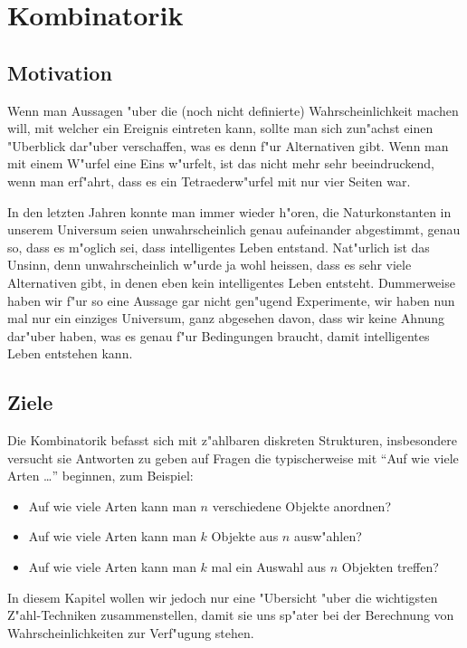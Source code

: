 %
%
%
\chapter{Kombinatorik} \label{chapter-kombinatorik}
\section{Motivation}
Wenn man Aussagen "uber die (noch nicht definierte) Wahrscheinlichkeit
machen will, mit welcher ein Ereignis eintreten kann, sollte man sich
zun"achst einen "Uberblick dar"uber verschaffen, was es denn f"ur
Alternativen gibt.
Wenn man mit einem W"urfel eine Eins w"urfelt, ist
das nicht mehr sehr beeindruckend, wenn man erf"ahrt, dass es ein
Tetraederw"urfel mit nur vier Seiten war. 

In den letzten Jahren konnte man immer wieder h"oren, die Naturkonstanten
in unserem Universum seien unwahrscheinlich genau aufeinander abgestimmt,
genau so, dass es m"oglich sei, dass intelligentes Leben entstand.
Nat"urlich ist das Unsinn, denn unwahrscheinlich w"urde ja wohl
heissen, dass es sehr viele Alternativen gibt, in denen eben kein
intelligentes Leben entsteht.
Dummerweise haben wir f"ur so eine Aussage
gar nicht gen"ugend Experimente, wir haben nun mal nur ein einziges
Universum, ganz abgesehen davon, dass wir keine Ahnung dar"uber haben,
was es genau f"ur Bedingungen braucht, damit intelligentes Leben
entstehen kann.

\section{Ziele}
Die Kombinatorik befasst sich mit z"ahlbaren diskreten Strukturen,
insbesondere versucht sie Antworten zu geben auf Fragen die
typischerweise mit ``Auf wie viele Arten \dots'' beginnen, zum Beispiel:
\begin{itemize}
\item Auf wie viele Arten kann man $n$ verschiedene Objekte anordnen?
\item Auf wie viele Arten kann man $k$ Objekte aus $n$ ausw"ahlen?
\item Auf wie viele Arten kann man $k$ mal ein Auswahl aus $n$ Objekten
treffen?
\end{itemize}

In diesem Kapitel wollen wir jedoch nur eine "Ubersicht "uber die
wichtigsten Z"ahl-Techniken zusammenstellen, damit sie uns sp"ater
bei der Berechnung von Wahrscheinlichkeiten zur Verf"ugung stehen.

